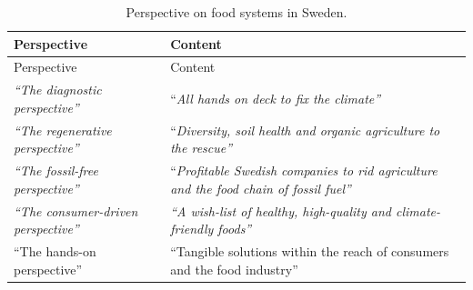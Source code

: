 \documentclass[
  letterpaper,
  DIV=11,
  numbers=noendperiod]{scrartcl}
\begin{document}
\begin{longtable}[]{@{}
  >{\raggedright\arraybackslash}p{}
  >{\raggedright\arraybackslash}p{}@{}}
\caption{Perspective on food systems in Sweden.}\tabularnewline
\toprule\noalign{}
\begin{minipage}[b]{\linewidth}\raggedright
Perspective
\end{minipage} & \begin{minipage}[b]{\linewidth}\raggedright
Content
\end{minipage} \\
\midrule\noalign{}
\endfirsthead
\toprule\noalign{}
\begin{minipage}[b]{\linewidth}\raggedright
Perspective
\end{minipage} & \begin{minipage}[b]{\linewidth}\raggedright
Content
\end{minipage} \\
\midrule\noalign{}
\endhead
\bottomrule\noalign{}
\endlastfoot
\emph{``The diagnostic perspective''} & ``\emph{All hands on deck to fix
the climate''} \\
\emph{``The regenerative perspective''} & ``\emph{Diversity, soil health
and organic agriculture to the rescue''} \\
\emph{``The fossil-free perspective''} & ``\emph{Profitable Swedish
companies to rid agriculture and the food chain of fossil fuel''} \\
\emph{``The consumer-driven perspective''} & \emph{``A wish-list of
healthy, high-quality and climate-friendly foods''} \\
``The hands-on perspective'' & ``Tangible solutions within the reach of
consumers and the food industry'' \\
\end{longtable}
\end{document}
